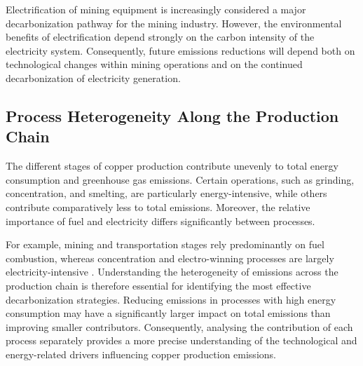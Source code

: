 Electrification of mining equipment is increasingly considered a major decarbonization pathway for the mining industry. However, the environmental benefits of electrification depend strongly on the carbon intensity of the electricity system. Consequently, future emissions reductions will depend both on technological changes within mining operations and on the continued decarbonization of electricity generation.


\subsection{Process Heterogeneity Along the Production Chain}
\label{sec:heterogeneity}
The different stages of copper production contribute unevenly to total energy consumption and greenhouse gas emissions. Certain operations, such as grinding, concentration, and smelting, are particularly energy-intensive, while others contribute comparatively less to total emissions. Moreover, the relative importance of fuel and electricity differs significantly between processes.

For example, mining and transportation stages rely predominantly on fuel combustion, whereas concentration and electro-winning processes are largely electricity-intensive \cite{Cochilco2024}. Understanding the heterogeneity of emissions across the production chain is therefore essential for identifying the most effective decarbonization strategies. Reducing emissions in processes with high energy consumption may have a significantly larger impact on total emissions than improving smaller contributors. Consequently, analysing the contribution of each process separately provides a more precise understanding of the technological and energy-related drivers influencing copper production emissions.